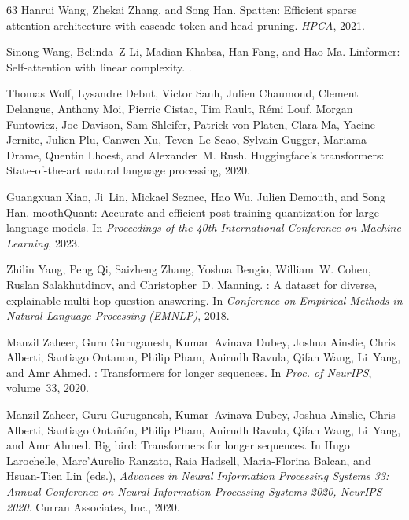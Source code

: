 \documentclass{article} \usepackage{iclr2024_conference,times}
\begin{document}
\begin{thebibliography}{63}
Hanrui Wang, Zhekai Zhang, and Song Han.
\newblock Spatten: Efficient sparse attention architecture with cascade token
  and head pruning.
\newblock \emph{HPCA}, 2021.

Sinong Wang, Belinda~Z Li, Madian Khabsa, Han Fang, and Hao Ma.
\newblock Linformer: Self-attention with linear complexity.
.

Thomas Wolf, Lysandre Debut, Victor Sanh, Julien Chaumond, Clement Delangue,
  Anthony Moi, Pierric Cistac, Tim Rault, Rémi Louf, Morgan Funtowicz, Joe
  Davison, Sam Shleifer, Patrick von Platen, Clara Ma, Yacine Jernite, Julien
  Plu, Canwen Xu, Teven~Le Scao, Sylvain Gugger, Mariama Drame, Quentin Lhoest,
  and Alexander~M. Rush.
\newblock Huggingface's transformers: State-of-the-art natural language
  processing, 2020.

Guangxuan Xiao, Ji~Lin, Mickael Seznec, Hao Wu, Julien Demouth, and Song Han.
mooth{Q}uant: Accurate and efficient post-training quantization
  for large language models.
\newblock In \emph{Proceedings of the 40th International Conference on Machine
  Learning}, 2023.

Zhilin Yang, Peng Qi, Saizheng Zhang, Yoshua Bengio, William~W. Cohen, Ruslan
  Salakhutdinov, and Christopher~D. Manning.
: A dataset for diverse, explainable multi-hop question
  answering.
\newblock In \emph{Conference on Empirical Methods in Natural Language
  Processing ({EMNLP})}, 2018.

Manzil Zaheer, Guru Guruganesh, Kumar~Avinava Dubey, Joshua Ainslie, Chris
  Alberti, Santiago Ontanon, Philip Pham, Anirudh Ravula, Qifan Wang, Li~Yang,
  and Amr Ahmed.
: {T}ransformers for longer sequences.
\newblock In \emph{Proc. of NeurIPS}, volume~33, 2020{}.

Manzil Zaheer, Guru Guruganesh, Kumar~Avinava Dubey, Joshua Ainslie, Chris
  Alberti, Santiago Ontañón, Philip Pham, Anirudh Ravula, Qifan Wang,
  Li~Yang, and Amr Ahmed.
\newblock Big bird: Transformers for longer sequences.
\newblock In Hugo Larochelle, Marc'Aurelio Ranzato, Raia Hadsell, Maria-Florina
  Balcan, and Hsuan-Tien Lin (eds.), \emph{Advances in Neural Information
  Processing Systems 33: Annual Conference on Neural Information Processing
  Systems 2020, NeurIPS 2020}. Curran Associates, Inc., 2020{}.


\end{thebibliography}
\end{document}
